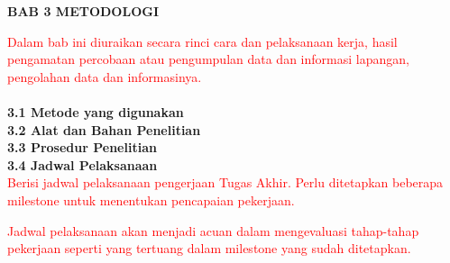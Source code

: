 \begin{spacing}{1.5}
\begin{center}
\textbf{\large BAB 3 METODOLOGI}
\end{center}

\textcolor{red}{\indent Dalam bab ini diuraikan secara rinci cara dan pelaksanaan kerja, hasil pengamatan percobaan atau pengumpulan data dan informasi lapangan, pengolahan data dan informasinya.}\\
\bigskip\\
\textbf{3.1 \indent Metode yang digunakan}
\bigskip\\
\textbf{3.2 \indent Alat dan Bahan Penelitian}
\bigskip\\
\textbf{3.3 \indent Prosedur Penelitian}
\bigskip\\
\textbf{3.4 \indent Jadwal Pelaksanaan}
\bigskip\\
\textcolor{red}{\indent \indent Berisi jadwal pelaksanaan pengerjaan Tugas Akhir. Perlu ditetapkan beberapa milestone untuk menentukan pencapaian pekerjaan.}

\medskip

\textcolor{red}{\indent Jadwal pelaksanaan akan menjadi acuan dalam mengevaluasi tahap-tahap pekerjaan seperti yang tertuang dalam milestone yang sudah ditetapkan.}


\end{spacing}